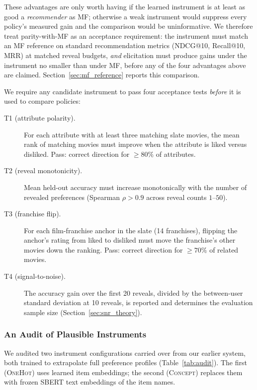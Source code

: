 \documentclass[11pt]{article}
\begin{document}
These advantages are only worth having if the learned instrument is at
least as good a \emph{recommender} as MF; otherwise a weak instrument would
suppress every policy's measured gain and the comparison would be
uninformative. We therefore treat parity-with-MF as an acceptance
requirement: the instrument must match an MF reference on standard
recommendation metrics (NDCG@10, Recall@10, MRR) at matched reveal budgets,
\emph{and} elicitation must produce gains under the instrument no smaller
than under MF, before any of the four advantages above are claimed.
Section~\ref{sec:mf_reference} reports this comparison.

We require any candidate instrument to pass four acceptance tests
\emph{before} it is used to compare policies:

\begin{description}
  \item[T1 (attribute polarity).] For each attribute with at least three
  matching slate movies, the mean rank of matching movies must improve when
  the attribute is \textsf{liked} versus \textsf{disliked}. Pass: correct
  direction for $\geq 80\%$ of attributes.
  \item[T2 (reveal monotonicity).] Mean held-out accuracy must increase
  monotonically with the number of revealed preferences (Spearman
  $\rho > 0.9$ across reveal counts $1$--$50$).
  \item[T3 (franchise flip).] For each film-franchise anchor in the slate
  (14 franchises), flipping the anchor's rating from \textsf{liked} to
  \textsf{disliked} must move the franchise's other movies down the
  ranking. Pass: correct direction for $\geq 70\%$ of related movies.
  \item[T4 (signal-to-noise).] The accuracy gain over the first 20 reveals,
  divided by the between-user standard deviation at 10 reveals, is
  reported and determines the evaluation sample size
  (Section~\ref{sec:snr_theory}).
\end{description}

\subsubsection{An Audit of Plausible Instruments}
\label{sec:instrument_audit}

We audited two instrument configurations carried over from our earlier
system, both trained to extrapolate full preference profiles
(Table~\ref{tab:audit}). The first (\textsc{OneHot}) uses learned item
embeddings; the second (\textsc{Concept}) replaces them with frozen
SBERT \citep{reimers2019sentence} text embeddings of the item names.
\end{document}
